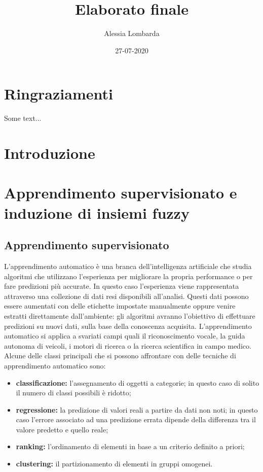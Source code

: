 \documentclass[oneside, openany]{book}
\title{Elaborato finale}
\date{27-07-2020}
\author{Alessia Lombarda}
\begin{document}
	\begin{titlepage}
		
	\end{titlepage}
	\frontmatter
	\chapter*{Ringraziamenti}
	Some text...
	\tableofcontents
	\mainmatter
	\chapter*{Introduzione}
		{} 
	\chapter{Apprendimento supervisionato e induzione di insiemi fuzzy}
		\section{Apprendimento supervisionato}
		L'apprendimento automatico è una branca dell'intelligenza artificiale che studia algoritmi che utilizzano l'esperienza per migliorare la propria performance o per fare predizioni più accurate. In questo caso l'esperienza viene rappresentata attraverso una collezione di dati resi disponibili all'analisi. Questi dati possono essere aumentati con delle etichette impostate manualmente oppure venire estratti direttamente dall'ambiente: gli algoritmi avranno l'obiettivo di effettuare predizioni su nuovi dati, sulla base della conoscenza acquisita.
		L'apprendimento automatico si applica a svariati campi quali il riconoscimento vocale, la guida autonoma di veicoli, i motori di ricerca o la ricerca scientifica in campo medico. Alcune delle classi principali che si possono affrontare con delle tecniche di apprendimento automatico sono:
		\begin{itemize}
			\item\textbf{classificazione:} l'assegnamento di oggetti a categorie; in questo caso di solito il numero di classi possibili è ridotto;
			\item\textbf{regressione:} la predizione di valori reali a partire da dati non noti; in questo caso l'errore associato ad una predizione errata dipende della differenza tra il valore predetto e quello reale;
			\item\textbf{ranking:} l'ordinamento di elementi in base a un criterio definito a priori;
			\item\textbf{clustering:} il partizionamento di elementi in gruppi omogenei.
		\end{itemize}
	
\end{document}
